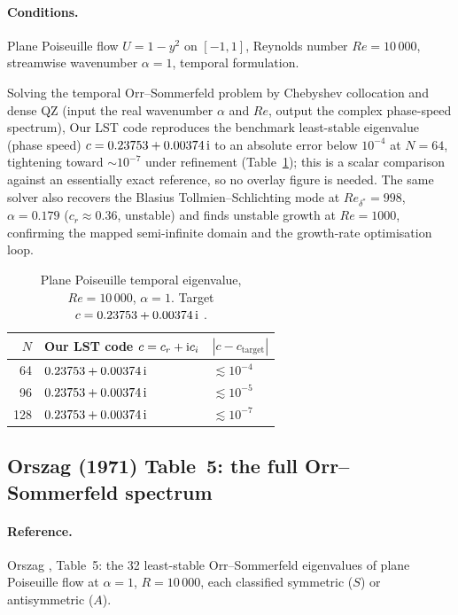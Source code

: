\documentclass[11pt]{article}
\begin{document}
\paragraph{Conditions.} Plane Poiseuille flow $U=1-y^2$ on $[-1,1]$, Reynolds number $Re=10\,000$,
streamwise wavenumber $\alpha=1$, temporal formulation.

Solving the temporal Orr--Sommerfeld problem by Chebyshev collocation and dense QZ (input the real
wavenumber $\alpha$ and $Re$, output the complex phase-speed spectrum), Our LST code reproduces the
benchmark least-stable eigenvalue (phase speed) $c=0.23753+0.00374\,\mathrm{i}$ to an absolute error
below $10^{-4}$ at $N=64$, tightening toward $\sim\!10^{-7}$ under refinement (Table~\ref{tab:orszag}); this is a scalar comparison against an
essentially exact reference, so no overlay figure is needed. The same solver also recovers the
Blasius Tollmien--Schlichting mode at $Re_{\delta^\ast}=998$, $\alpha=0.179$ ($c_r\approx0.36$,
unstable) and finds unstable growth at $Re=1000$, confirming the mapped semi-infinite domain and
the growth-rate optimisation loop.

\begin{table}[htbp]
\centering
\small
\caption{Plane Poiseuille temporal eigenvalue, $Re=10\,000$, $\alpha=1$. Target
$c=0.23753+0.00374\,\mathrm{i}$ \cite{orszag1971}.}
\label{tab:orszag}
\begin{tabular}{@{}rll@{}}
\toprule
$N$ & Our LST code $c=c_r+\mathrm{i} c_i$ & $|c-c_{\text{target}}|$ \\
\midrule
64  & $0.23753 + 0.00374\,\mathrm{i}$ & $\lesssim 10^{-4}$ \\
96  & $0.23753 + 0.00374\,\mathrm{i}$ & $\lesssim 10^{-5}$ \\
128 & $0.23753 + 0.00374\,\mathrm{i}$ & $\lesssim 10^{-7}$ \\
\bottomrule
\end{tabular}
\end{table}

\subsection{Orszag (1971) Table~5: the full Orr--Sommerfeld spectrum}
\label{sec:orszag-spectrum}

\paragraph{Reference.} Orszag \cite{orszag1971}, Table~5: the 32 least-stable Orr--Sommerfeld
eigenvalues of plane Poiseuille flow at $\alpha=1$, $R=10\,000$, each classified symmetric ($S$) or
antisymmetric ($A$).
\end{document}
